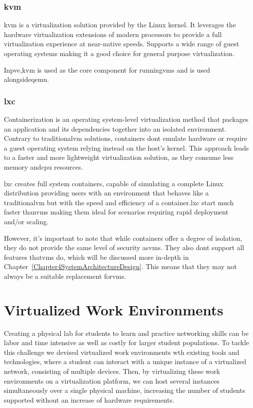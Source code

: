     \subsubsection{\ac{kvm}}
      \ac{kvm} is a virtualization solution provided by the Linux kernel. It leverages the hardware virtualization extensions 
      of modern processors to provide a full virtualization experience at near-native speeds. Supports a wide range of guest 
      operating systems making it a good choice for general purpose virtualization.

      In\ac{pve},\ac{kvm} is used as the core component for running\ac{vm}s and is used alongside\ac{qemu}.

    \subsubsection{\ac{lxc}}
      Containerization is an operating system-level virtualization method that packages an application and its dependencies
      together into an isolated environment. Contrary to traditional\ac{vm} solutions, containers dont emulate hardware or require a 
      guest operating system relying instead on the host's kernel. This approach leads to a faster and more lightweight 
      virtualization solution, as they consume less memory and\ac{cpu} resources.

      \ac{lxc} creates full system containers, capable of simulating a complete Linux distribution providing users with an 
      environment that behaves like a traditional\ac{vm} but with the speed and efficiency of a container.\ac{lxc} start 
      much faster than\ac{vm}s making them ideal for scenarios requiring rapid deployment and/or scaling.

      However, it's important to note that while containers offer a degree of isolation, they do not provide the same level of
      security as\ac{vm}s. They also dont support all features that\ac{vm}s do, which will be discussed more in-depth in 
      Chapter~\ref{Chapter4SystemArchitectureDesign}. This means that they may not always be a suitable replacement for\ac{vm}s.

\section{Virtualized Work Environments}
  Creating a physical lab for students to learn and practice networking skills can be labor and time intensive as well as costly for larger student populations.
  To tackle this challenge we devised virtualized work environments wth existing tools and technologies, where a student can interact with a unique instance of a 
  virtualized network, consisting of multiple devices. Then, by virtualizing these work environments on a virtualization platform, we can 
  host several instances simultaneously over a single physical machine, increasing the number of students supported without an increase of hardware 
  requirements.
  
